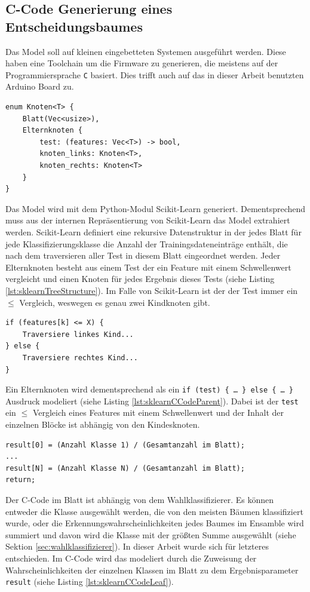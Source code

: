 \subsection{C-Code Generierung eines Entscheidungsbaumes}
\label{sec:cCodeTree}
Das Model soll auf kleinen eingebetteten Systemen ausgeführt werden. Diese haben eine Toolchain um die Firmware zu generieren, die meistens auf der Programmiersprache \texttt{C} basiert. Dies trifft auch auf das in
dieser Arbeit benutzten Arduino Board zu.
\begin{lstlisting}[label=lst:sklearnTreeStructure,caption={Skizze der rekursiven Datenstruktur für Entscheidungsbäume die von Scikit-Learn genutzt wird.}]
enum Knoten<T> {
    Blatt(Vec<usize>),
    Elternknoten {
        test: (features: Vec<T>) -> bool,
        knoten_links: Knoten<T>,
        knoten_rechts: Knoten<T>
    }
}
\end{lstlisting}
Das Model wird mit dem Python-Modul Scikit-Learn generiert. Dementsprechend muss aus der internen Repräsentierung von Scikit-Learn das Model extrahiert werden. Scikit-Learn definiert eine rekursive Datenstruktur in
der jedes Blatt für jede Klassifizierungsklasse die Anzahl der Trainingsdateneinträge enthält, die nach dem traversieren aller Test in diesem Blatt eingeordnet werden. Jeder Elternknoten besteht aus einem Test der
ein Feature mit einem Schwellenwert vergleicht und einen Knoten für jedes Ergebnis dieses Tests (siehe Listing \ref{lst:sklearnTreeStructure}). Im Falle von Scikit-Learn ist der der Test immer
ein $\leq$ Vergleich, weswegen es genau zwei Kindknoten gibt.
\begin{lstlisting}[label=lst:sklearnCCodeParent,caption={C-Code eines Elternknotens.}]
if (features[k] <= X) {
    Traversiere linkes Kind...
} else {
    Traversiere rechtes Kind...
}
\end{lstlisting}
Ein Elternknoten wird dementsprechend als ein \texttt{if (test) \{ \ldots\ \} else \{ \ldots\ \}} Ausdruck modeliert (siehe Listing \ref{lst:sklearnCCodeParent}). Dabei ist der \texttt{test} ein $\leq$ Vergleich eines
Features mit einem Schwellenwert und der Inhalt der einzelnen Blöcke ist abhängig von den Kindesknoten.
\begin{lstlisting}[label=lst:sklearnCCodeLeaf,caption={C-Code eines Blattes.}]
result[0] = (Anzahl Klasse 1) / (Gesamtanzahl im Blatt);
...
result[N] = (Anzahl Klasse N) / (Gesamtanzahl im Blatt);
return;
\end{lstlisting}
Der C-Code im Blatt ist abhängig von dem Wahlklassifizierer. Es können entweder die Klasse ausgewählt werden, die von den meisten Bäumen klassifiziert wurde, oder die
Erkennungswahrscheinlichkeiten jedes Baumes im Ensamble wird summiert und davon wird die Klasse mit der größten Summe ausgewählt (siehe Sektion \ref{sec:wahlklassifizierer}).
In dieser Arbeit wurde sich für letzteres entschieden. Im C-Code wird das modeliert durch die Zuweisung der Wahrscheinlichkeiten der einzelnen Klassen im Blatt zu dem Ergebnisparameter
\texttt{result} (siehe Listing \ref{lst:sklearnCCodeLeaf}).


